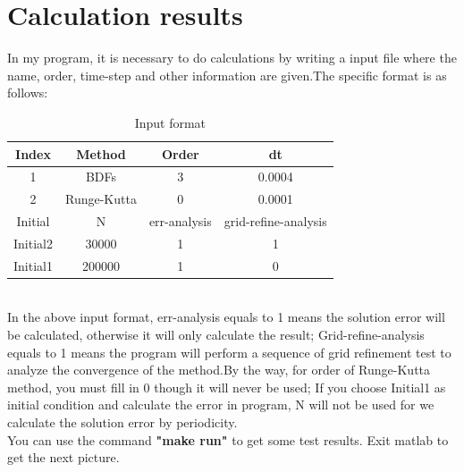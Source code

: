 \documentclass[a4paper,twocolumn]{article}
\theoremstyle{definition}
\begin{document}
\section{Calculation results}
In my program, it is necessary to do calculations by writing a input file where the name, order, time-step and other information are given.The specific format is as follows:
\begin{table}[!htp]
	\centering
	\begin{tabular}{|c|c|c|c|}
		\hline	
		Index & Method & Order & dt \\
		\hline		
		1 & BDFs & 3 & 0.0004   \\	
		\hline		
		2 & Runge-Kutta & 0 & 0.0001   \\	
		\hline \hline
		Initial & N & err-analysis & grid-refine-analysis \\
		\hline
		Initial2 & 30000 & 1 & 1 \\
		\hline
		Initial1 & 200000 & 1 & 0 \\
		\hline
	\end{tabular}
	\caption{Input format}
	\label{tab:format}
\end{table}\\
In the above input format, err-analysis equals to 1 means the solution error will be calculated, otherwise it will only calculate the result; Grid-refine-analysis equals to 1 means the program will perform a sequence of grid refinement test to analyze the convergence of the method.By the way, for order of Runge-Kutta method, you must fill in 0 though it will never be used; If you choose Initial1 as initial condition and calculate the error in program, N will not be used for we calculate the solution error by periodicity.\\
You can use the command \textbf{"make run"} to get some test results. Exit matlab to get the next picture.

\end{document}
